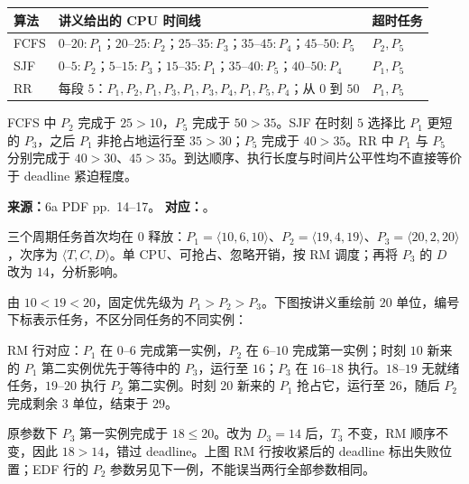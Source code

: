 \begin{checkedsolution}
\begin{center}
\begin{tabularx}{\textwidth}{@{}lXl@{}}
\toprule
算法 & 讲义给出的 CPU 时间线 & 超时任务 \\
\midrule
FCFS & $0$--$20:P_1$；$20$--$25:P_2$；$25$--$35:P_3$；$35$--$45:P_4$；$45$--$50:P_5$ & $P_2,P_5$ \\
SJF & $0$--$5:P_2$；$5$--$15:P_3$；$15$--$35:P_1$；$35$--$40:P_5$；$40$--$50:P_4$ & $P_1,P_5$ \\
RR & 每段 $5$：$P_1,P_2,P_1,P_3,P_1,P_3,P_4,P_1,P_5,P_4$；从 $0$ 到 $50$ & $P_1,P_5$ \\
\bottomrule
\end{tabularx}
\end{center}
FCFS 中 $P_2$ 完成于 $25>10$，$P_5$ 完成于 $50>35$。SJF 在时刻 $5$ 选择比 $P_1$ 更短的 $P_3$，之后 $P_1$ 非抢占地运行至 $35>30$；$P_5$ 完成于 $40>35$。RR 中 $P_1$ 与 $P_5$ 分别完成于 $40>30$、$45>35$。到达顺序、执行长度与时间片公平性均不直接等价于 deadline 紧迫程度。
\end{checkedsolution}


\textbf{来源：}6a PDF pp.~14--17。\quad
\textbf{对应：}。

三个周期任务首次均在 $0$ 释放：$P_1=\langle10,6,10\rangle$、$P_2=\langle19,4,19\rangle$、$P_3=\langle20,2,20\rangle$，次序为 $\langle T,C,D\rangle$。单 CPU、可抢占、忽略开销，按 RM 调度；再将 $P_3$ 的 $D$ 改为 $14$，分析影响。

\begin{checkedsolution}
由 $10<19<20$，固定优先级为 $P_1>P_2>P_3$。下图按讲义重绘前 $20$ 单位，编号下标表示任务，不区分同任务的不同实例：
\begin{center}
  
\end{center}
RM 行对应：$P_1$ 在 $0$--$6$ 完成第一实例，$P_2$ 在 $6$--$10$ 完成第一实例；时刻 $10$ 新来的 $P_1$ 第二实例优先于等待中的 $P_3$，运行至 $16$；$P_3$ 在 $16$--$18$ 执行。$18$--$19$ 无就绪任务，$19$--$20$ 执行 $P_2$ 第二实例。时刻 $20$ 新来的 $P_1$ 抢占它，运行至 $26$，随后 $P_2$ 完成剩余 $3$ 单位，结束于 $29$。

原参数下 $P_3$ 第一实例完成于 $18\le20$。改为 $D_3=14$ 后，$T_3$ 不变，RM 顺序不变，因此 $18>14$，错过 deadline。上图 RM 行按收紧后的 deadline 标出失败位置；EDF 行的 $P_2$ 参数另见下一例，不能误当两行全部参数相同。
\end{checkedsolution}

